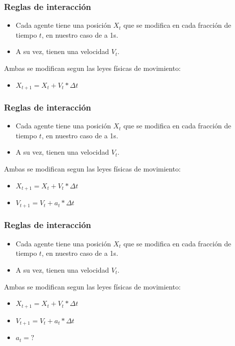 \documentclass[10pt, compress]{beamer}
\begin{document}
\begin{frame}[fragile]

\frametitle{Reglas de interacci\'on}
\begin{itemize}
\item Cada agente tiene una posici\'on $X_t$ que se modifica en cada fracci\'on de tiempo $t$, en nuestro caso de a 1s.
\item A su vez, tienen una velocidad $V_t$.
\end{itemize}
Ambas se modifican segun las leyes f\'isicas de movimiento:
\begin{itemize}
\item $X_{t+1} = X_t + V_t * \Delta t$
\end{itemize}
\addtocounter{framenumber}{-1}
\end{frame}

\begin{frame}[fragile]

\frametitle{Reglas de interacci\'on}
\begin{itemize}
\item Cada agente tiene una posici\'on $X_t$ que se modifica en cada fracci\'on de tiempo $t$, en nuestro caso de a 1s.
\item A su vez, tienen una velocidad $V_t$.
\end{itemize}
Ambas se modifican segun las leyes f\'isicas de movimiento:
\begin{itemize}
\item $X_{t+1} = X_t + V_t * \Delta t$
\item $V_{t+1} = V_t + a_t * \Delta t$
\end{itemize}
\addtocounter{framenumber}{-1}
\end{frame}

\begin{frame}[fragile]

\frametitle{Reglas de interacci\'on}
\begin{itemize}
\item Cada agente tiene una posici\'on $X_t$ que se modifica en cada fracci\'on de tiempo $t$, en nuestro caso de a 1s.
\item A su vez, tienen una velocidad $V_t$.
\end{itemize}
Ambas se modifican segun las leyes f\'isicas de movimiento:
\begin{itemize}
\item $X_{t+1} = X_t + V_t * \Delta t$
\item $V_{t+1} = V_t + a_t * \Delta t$
\item $a_t = ?$ 
\end{itemize}
\addtocounter{framenumber}{-1}
\end{frame}
\end{document}
